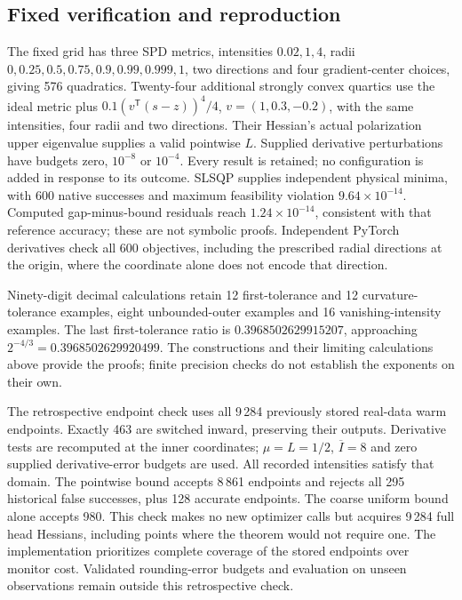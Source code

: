 \documentclass[10pt,a4paper]{article}
\begin{document}
\subsection{Fixed verification and reproduction}
The fixed grid has three SPD metrics, intensities $0.02,1,4$, radii $0,0.25,0.5,0.75,0.9,0.99,0.999,1$, two directions and four gradient-center choices, giving 576 quadratics. Twenty-four additional strongly convex quartics use the ideal metric plus $0.1(v^{\mathsf T}(s-z))^4/4$, $v=(1,0.3,-0.2)$, with the same intensities, four radii and two directions. Their Hessian's actual polarization upper eigenvalue supplies a valid pointwise $L$. Supplied derivative perturbations have budgets zero, $10^{-8}$ or $10^{-4}$. Every result is retained; no configuration is added in response to its outcome. SLSQP supplies independent physical minima, with 600 native successes and maximum feasibility violation $9.64\times10^{-14}$. Computed gap-minus-bound residuals reach $1.24\times10^{-14}$, consistent with that reference accuracy; these are not symbolic proofs. Independent PyTorch derivatives check all 600 objectives, including the prescribed radial directions at the origin, where the coordinate alone does not encode that direction.

Ninety-digit decimal calculations retain 12 first-tolerance and 12 curvature-tolerance examples, eight unbounded-outer examples and 16 vanishing-intensity examples. The last first-tolerance ratio is $0.3968502629915207$, approaching $2^{-4/3}=0.3968502629920499$. The constructions and their limiting calculations above provide the proofs; finite precision checks do not establish the exponents on their own.

The retrospective endpoint check uses all 9\,284 previously stored real-data warm endpoints. Exactly 463 are switched inward, preserving their outputs. Derivative tests are recomputed at the inner coordinates; $\mu=L=1/2$, $\overline I=8$ and zero supplied derivative-error budgets are used. All recorded intensities satisfy that domain. The pointwise bound accepts 8\,861 endpoints and rejects all 295 historical false successes, plus 128 accurate endpoints. The coarse uniform bound alone accepts 980. This check makes no new optimizer calls but acquires 9\,284 full head Hessians, including points where the theorem would not require one. The implementation prioritizes complete coverage of the stored endpoints over monitor cost. Validated rounding-error budgets and evaluation on unseen observations remain outside this retrospective check.
\end{document}
